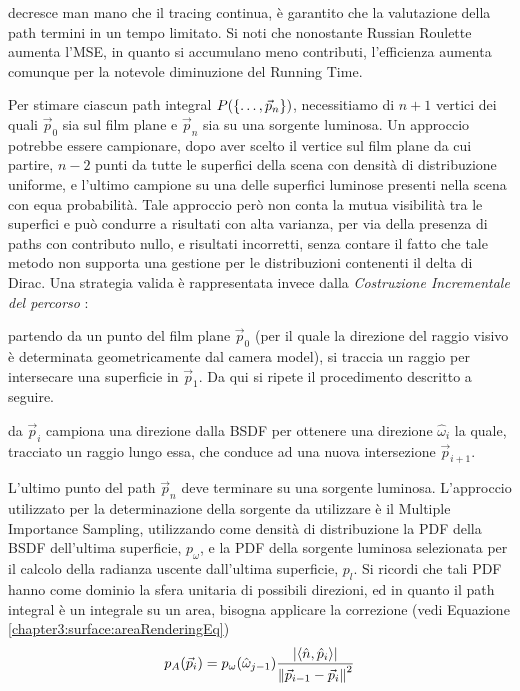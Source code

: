 decresce man mano che il tracing continua, \`e garantito che la valutazione della path termini in un tempo limitato. Si noti che nonostante Russian
Roulette aumenta l'MSE, in quanto si accumulano meno contributi, l'efficienza aumenta comunque per la notevole diminuzione del Running Time.\par
Per stimare ciascun path integral $P(\{\ldots,\vec{p}_{n}\})$, necessitiamo di $n+1$ vertici dei quali $\vec{p}_0$ sia sul film plane e $\vec{p}_n$ sia su una 
sorgente luminosa. Un approccio potrebbe essere campionare, dopo aver scelto il vertice sul film plane da cui partire, $n-2$ punti da tutte le 
superfici della scena con densit\`a di distribuzione uniforme, e l'ultimo campione su una delle superfici luminose presenti nella scena con equa
probabilit\`a. Tale approccio per\`o non conta la mutua visibilit\`a tra le superfici e pu\`o condurre a risultati con alta varianza, per via della 
presenza di paths con contributo nullo, e risultati incorretti, senza contare il fatto che tale metodo non supporta una gestione per le distribuzioni
contenenti il delta di Dirac. Una strategia valida \`e rappresentata invece dalla \textit{Costruzione Incrementale del percorso} \cite{pharr}:\par
partendo da un punto del film plane $\vec{p}_0$ (per il quale la direzione del raggio visivo \`e determinata geometricamente dal camera model),
si traccia un raggio per intersecare una superficie in $\vec{p}_1$. Da qui si ripete il procedimento descritto a seguire.\par
da $\vec{p}_i$ campiona una direzione dalla BSDF per ottenere una direzione $\hat{\omega}_i$ la quale, tracciato un raggio lungo essa, che conduce ad 
una nuova intersezione $\vec{p}_{i+1}$.\par
L'ultimo punto del path $\vec{p}_n$ deve terminare su una sorgente luminosa. L'approccio utilizzato per la determinazione della sorgente da utilizzare
\`e il Multiple Importance Sampling, utilizzando come densit\`a di distribuzione la PDF della BSDF dell'ultima superficie, $p_\omega$, e la PDF 
della sorgente luminosa selezionata per il calcolo della radianza uscente dall'ultima superficie, $p_l$. Si ricordi che tali PDF hanno come dominio
la sfera unitaria di possibili direzioni, ed 
in quanto il path integral \`e un integrale su un area, bisogna applicare la correzione (vedi Equazione \ref{chapter3:surface:areaRenderingEq})
\begin{equation}
	p_A(\vec{p}_i)=p_\omega(\hat{\omega}_{j-1})\frac{|\langle\hat{n},\hat{p}_i\rangle|}{\norm{\vec{p}_{i-1}-\vec{p}_i}^2}
\end{equation}
